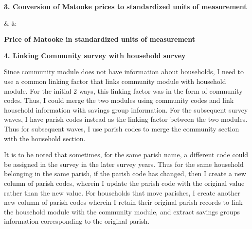 \documentclass[12pt]{article}
\begin{document}
{{\textbf{ 3. Conversion of Matooke prices to standardized units of measurement}


\begin{table}[htbp]
  \centering
  {\csvcoli & \csvcolii & \csvcoliii}
  \caption{\bfseries Price of Matooke in standardized units of measurement}
  \label{tab:matooke}
\end{table}

\clearpage 

\textbf{ 4. Linking Community survey with household survey}

\hspace{1cm} Since community module does not have information about households, I need to use a common linking factor that links community module with household module. For the initial 2 ways, this linking factor was in the form of community codes. Thus, I could merge the two modules using community codes and link household information with savings group information. For the subsequent survey waves, I have parish codes instead as the linking factor between the two modules. Thus for subsequent waves, I use parish codes to merge the community section with the household section. 

\hspace{1cm} It is to be noted that sometimes, for the same parish name, a different code could be assigned in the survey in the later survey years. Thus for the same household belonging in the same parish, if the parish code has changed, then I create a new column of parish codes, wherein I update the parish code with the original value rather than the new value. For households that move parishes, I create another new column of parish codes wherein I retain their original parish records to link the household module with the community module, and extract savings groups information corresponding to the original parish. 

}}
\end{document}
